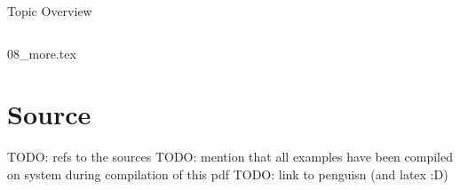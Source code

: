 



\begin{frame}{Topic Overview}
\begin{columns}[c,onlytextwidth]
\tableofcontents[sections={1-4}]
\tableofcontents[sections={5-8}]
\end{columns}
\end{frame}

{08_more.tex}

\appendix
\beginbackup



\section{Source}
\begin{frame}
   TODO: refs to the sources
   TODO: mention that all examples have been compiled on system during compilation of this pdf
   TODO: link to penguisn (and latex :D)
\end{frame}
\backupend


